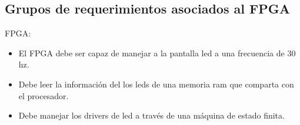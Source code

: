 \subsection{Grupos de requerimientos asociados al FPGA}
FPGA:
\begin{itemize}
\item El FPGA debe ser capaz de manejar a la pantalla led a una frecuencia de  30 hz.
\item Debe leer la información del los leds de una memoria ram que comparta con el procesador.
\item Debe manejar los drivers de led a través de una máquina de estado finita.   
\end{itemize}
